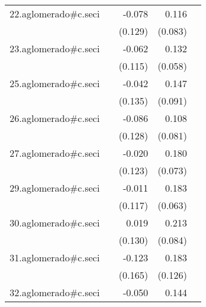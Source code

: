 {\begin{longtable}{l*{4}{D{.}{.}{-1}}}
\addlinespace
22.aglomerado#c.seci&                     &      -0.078         &       0.116         &                     \\
            &                     &     (0.129)         &     (0.083)         &                     \\
\addlinespace
23.aglomerado#c.seci&                     &      -0.062         &       0.132\sym{*}  &                     \\
            &                     &     (0.115)         &     (0.058)         &                     \\
\addlinespace
25.aglomerado#c.seci&                     &      -0.042         &       0.147         &                     \\
            &                     &     (0.135)         &     (0.091)         &                     \\
\addlinespace
26.aglomerado#c.seci&                     &      -0.086         &       0.108         &                     \\
            &                     &     (0.128)         &     (0.081)         &                     \\
\addlinespace
27.aglomerado#c.seci&                     &      -0.020         &       0.180\sym{*}  &                     \\
            &                     &     (0.123)         &     (0.073)         &                     \\
\addlinespace
29.aglomerado#c.seci&                     &      -0.011         &       0.183\sym{**} &                     \\
            &                     &     (0.117)         &     (0.063)         &                     \\
\addlinespace
30.aglomerado#c.seci&                     &       0.019         &       0.213\sym{*}  &                     \\
            &                     &     (0.130)         &     (0.084)         &                     \\
\addlinespace
31.aglomerado#c.seci&                     &      -0.123         &       0.183         &                     \\
            &                     &     (0.165)         &     (0.126)         &                     \\
\addlinespace
32.aglomerado#c.seci&                     &      -0.050         &       0.144         &                     \\

\end{longtable}}
